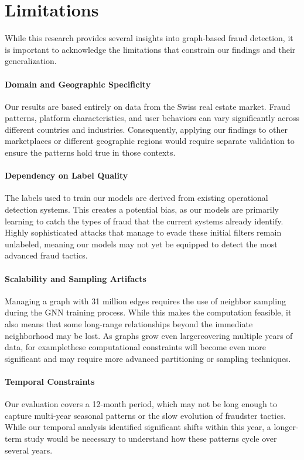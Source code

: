 \section{Limitations}
\label{sec:6_3}

While this research provides several insights into graph-based fraud detection, it is important to acknowledge the limitations that constrain our findings and their generalization.

\paragraph{Domain and Geographic Specificity}
Our results are based entirely on data from the Swiss real estate market. Fraud patterns, platform characteristics, and user behaviors can vary significantly across different countries and industries. Consequently, applying our findings to other marketplaces or different geographic regions would require separate validation to ensure the patterns hold true in those contexts.

\paragraph{Dependency on Label Quality}
The labels used to train our models are derived from existing operational detection systems. This creates a potential bias, as our models are primarily learning to catch the types of fraud that the current systems already identify. Highly sophisticated attacks that manage to evade these initial filters remain unlabeled, meaning our models may not yet be equipped to detect the most advanced fraud tactics.

\paragraph{Scalability and Sampling Artifacts}
Managing a graph with 31 million edges requires the use of neighbor sampling during the GNN training process. While this makes the computation feasible, it also means that some long-range relationships beyond the immediate neighborhood may be lost. As graphs grow even largercovering multiple years of data, for examplethese computational constraints will become even more significant and may require more advanced partitioning or sampling techniques.

\paragraph{Temporal Constraints}
Our evaluation covers a 12-month period, which may not be long enough to capture multi-year seasonal patterns or the slow evolution of fraudster tactics. While our temporal analysis identified significant shifts within this year, a longer-term study would be necessary to understand how these patterns cycle over several years.
